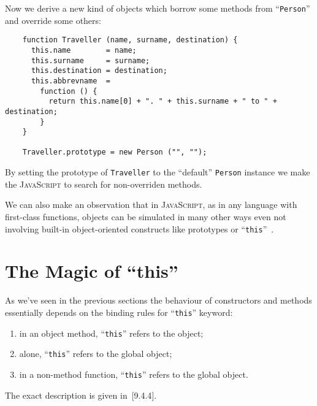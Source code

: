 \documentclass{article}
\newcommand{\js}{\textsc{JavaScript}\xspace}
\newcommand{\rf}[1]{[\textsc{#1}]}
\begin{document}
Now we derive a new kind of objects which borrow some methods from
``\lstinline|Person|'' and override some others:

\begin{lstlisting}
    function Traveller (name, surname, destination) {
      this.name        = name;
      this.surname     = surname;
      this.destination = destination;
      this.abbrevname  =
        function () {
          return this.name[0] + ". " + this.surname + " to " + destination; 
        }
    }

    Traveller.prototype = new Person ("", "");
\end{lstlisting}

By setting the prototype of \lstinline|Traveller| to the ``default'' \lstinline|Person| instance we
make the \js to search for non-overriden methods.

We can also make an observation that in \js, as in any language with first-class functions,
objects can be simulated in many other ways even not involving built-in object-oriented
constructs like prototypes or ``\lstinline|this|''~\cite{Inheritance}.

\section{The Magic of ``\textrm{this}''}
\label{sec:this}

As we've seen in the previous sections the behaviour of constructors and methods essentially
depends on the binding rules for ``\lstinline|this|'' keyword:

\begin{enumerate}
\item in an object method, ``\lstinline|this|'' refers to the object;
\item alone, ``\lstinline|this|'' refers to the global object;
\item in a non-method function, ``\lstinline|this|'' refers to the global object.
\end{enumerate}

The exact description is given in~\rf{9.4.4}.



\end{document}
